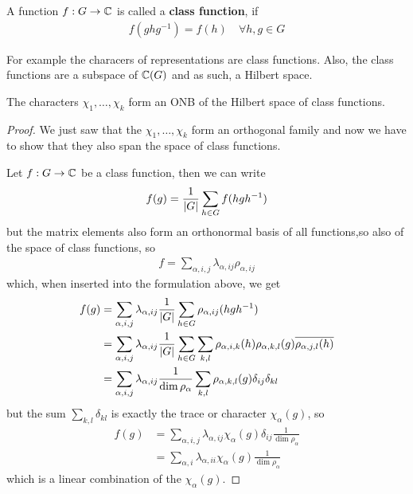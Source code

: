 \begin{dfn}[]
A function $f: G \to  \mathbb{C}$ is called a \textbf{class function}, if
\begin{align*}
  f(ghg^{-1}) = f(h) \quad \forall h,g \in G
\end{align*}
\end{dfn}
For example the characers of representations are class functions.
Also, the class functions are a subspace of $\mathbb{C}(G)$ and as such, a Hilbert space.


\begin{cor}[]
The characters $\chi_{1}, \ldots, \chi_{k}$ form an ONB of the Hilbert space of class functions.
\end{cor}
\begin{proof}
We just saw that the $\chi_{1}, \ldots, \chi_{k}$ form an orthogonal family and now we have to show that they also span the space of class functions.

Let $f: G \to \mathbb{C}$ be a class function, then we can write
\begin{align*}
  f(g) = \frac{1}{\vert G\vert} \sum_{h \in G}f(hgh^{-1})
\end{align*}
but the matrix elements also form an orthonormal basis of all functions,so also of the space of class functions, so
\begin{align*}
  f = \sum_{\alpha,i,j} \lambda_{\alpha,ij} \rho_{\alpha,ij}
\end{align*}
which, when inserted into the formulation above, we get
\begin{align*}
  f(g) 
  &= 
  \sum_{\alpha,i,j} \lambda_{\alpha,ij} \frac{1}{\vert G\vert} \sum_{h \in G}\rho_{\alpha,ij} (hgh^{-1})\\
  &=
  \sum_{\alpha,i,j}\lambda_{\alpha,ij}
\frac{1}{\vert G\vert}\sum_{h \in G} \sum_{k,l} \rho_{\alpha,i,k}(h) \rho_{\alpha,k,l}(g) \overline{\rho_{\alpha,j,l}(h)}
  \\
  &=
  \sum_{\alpha,i,j}\lambda_{\alpha,ij} \frac{1}{\dim \rho_{\alpha}} \sum_{k,l} \rho_{\alpha,k,l}(g)  \delta_{ij}\delta_{kl}
\end{align*}
but the sum $\sum_{k,l} \delta_{kl}$ is exactly the trace or character $\chi_{\alpha}(g)$, so
\begin{align*}
  f(g)
  &=
  \sum_{\alpha,i,j}\lambda_{\alpha,ij} \chi_{\alpha}(g)\delta_{ij} \frac{1}{\dim \rho_{\alpha}}
  \\
  &=
  \sum_{\alpha,i}\lambda_{\alpha,ii}\chi_{\alpha}(g) \frac{1}{\dim \rho_{\alpha}}
\end{align*}
which is a linear combination of the $\chi_{\alpha}(g)$.
\end{proof}


